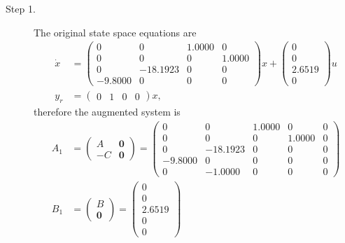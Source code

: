 \begin{description}
\item[Step 1.]
The original state space equations are 
\begin{align*}
\dot{x} &= \begin{pmatrix}
         0 &        0 &   1.0000 &        0 \\
         0 &        0 &        0 &   1.0000 \\
         0 & -18.1923 &        0 &        0 \\
   -9.8000 &        0 &        0 &        0
   \end{pmatrix} x + 
   \begin{pmatrix}  
         0 \\
         0 \\
    2.6519 \\
         0    
         \end{pmatrix} u \\
y_r &= \begin{pmatrix}
     0  &   1 &    0 &    0
     \end{pmatrix} x,
\end{align*}
therefore the augmented system is
\begin{align*}
A_1 &= \begin{pmatrix} A & \mathbf{0} \\ -C & \mathbf{0} \end{pmatrix} 
	= \begin{pmatrix}
         0 &        0 &   1.0000 &        0 &        0 \\
         0 &        0 &        0 &   1.0000 &        0 \\
         0 & -18.1923 &        0 &        0 &        0 \\
   -9.8000 &        0 &        0 &        0 &        0 \\
         0 &  -1.0000 &        0 &        0 &        0   \end{pmatrix} \\
B_1 &= \begin{pmatrix} B \\ \mathbf{0} \end{pmatrix} 
	= \begin{pmatrix}
         0 \\
         0 \\
    2.6519 \\
         0 \\
         0	 
   \end{pmatrix}
\end{align*}


\end{description}
